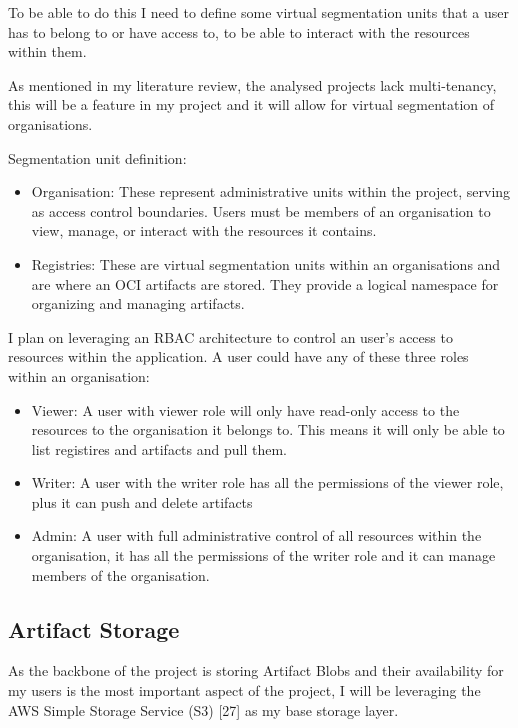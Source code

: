 \documentclass{article}
\begin{document}
  To be able to do this I need to define some virtual segmentation units that a user has to belong to or have access to, to be able to interact with the resources within them.

  As mentioned in my literature review, the analysed projects lack multi-tenancy, this will be a feature in my project and it will allow for virtual segmentation of organisations.

  Segmentation unit definition:
  \begin{itemize}
    \item Organisation: These represent administrative units within the project, serving as access control boundaries. Users must be members of an organisation to view, manage, or interact with the resources it contains.
    \item Registries: These are virtual segmentation units within an organisations and are where an OCI artifacts are stored. They provide a logical namespace for organizing and managing artifacts.
  \end{itemize}

  I plan on leveraging an RBAC architecture to control an user's access to resources within the application. A user could have any of these three roles within an organisation:
  \begin{itemize}
    \item Viewer: A user with viewer role will only have read-only access to the resources to the organisation it belongs to. This means it will only be able to list registires and artifacts and pull them.
    \item Writer: A user with the writer role has all the permissions of the viewer role, plus it can push and delete artifacts
    \item Admin: A user with full administrative control of all resources within the organisation, it has all the permissions of the writer role and it can manage members of the organisation.
  \end{itemize}

  \subsection{Artifact Storage}

  As the backbone of the project is storing Artifact Blobs and their availability for my users is the most important aspect of the project, I will be leveraging the AWS Simple Storage Service (S3) [27] as my base storage layer.
\end{document}
